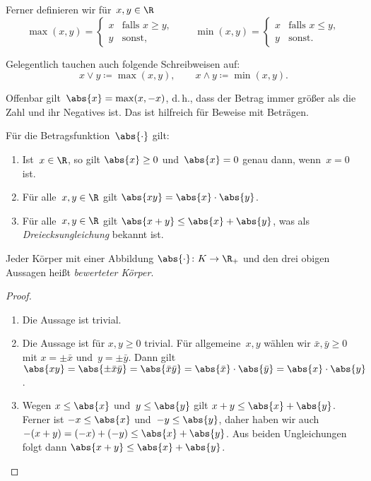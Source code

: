\documentclass[a4paper]{article}
\begin{document}
\begin{definition}
    Ferner definieren wir für~$x, y \in \R$
    \begin{equation*}
        \max(x, y) = \begin{cases}
            x & \text{falls } x \geq y, \\
            y & \text{sonst},
        \end{cases}\qquad
        \min(x, y) = \begin{cases}
            x & \text{falls } x \leq y, \\
            y & \text{sonst}.
        \end{cases}
    \end{equation*}
\end{definition}

Gelegentlich tauchen auch folgende Schreibweisen auf:
\begin{equation*}
    x \vee y \coloneqq \max(x, y), \qquad x \wedge y \coloneqq \min(x, y).
\end{equation*}

Offenbar gilt~$\abs{x} = \max(x, -x)$, d.\,h., dass der Betrag immer größer als die Zahl und ihr Negatives ist. Das ist hilfreich für Beweise mit Beträgen.

\begin{theorem}
    Für die Betragsfunktion~$\abs{\cdot}$ gilt:
    \begin{enumerate}
        \item Ist~$x \in \R$, so gilt $\abs{x} \geq 0$ und~$\abs{x} = 0$ genau dann, wenn~$x = 0$ ist.
        \item Für alle~$x, y \in \R$ gilt $\abs{x y} = \abs{x} \cdot \abs{y}$.
        \item Für alle~$x, y \in \R$ gilt $\abs{x + y} \leq \abs{x} + \abs{y}$, was als \emph{Dreiecksungleichung} bekannt ist.
    \end{enumerate}
\end{theorem}

Jeder Körper mit einer Abbildung $\abs{\cdot}\colon K \to \R_+$ und den drei obigen Aussagen heißt \emph{bewerteter Körper}.

\begin{proof}\leavevmode
    \begin{enumerate}
        \item Die Aussage ist trivial.
        \item Die Aussage ist für $x, y \geq 0$ trivial. Für allgemeine~$x, y$ wählen wir $\bar{x}, \bar{y} \geq 0$ mit $x = \pm\bar{x}$ und~$y = \pm\bar{y}$. Dann gilt $\abs{x y} = \abs{\pm \bar{x} \bar{y}} = \abs{\bar{x} \bar{y}} = \abs{\bar{x}} \cdot \abs{\bar{y}} = \abs{x} \cdot \abs{y}$.
        \item Wegen $x \leq \abs{x}$ und~$y \leq \abs{y}$ gilt $x + y \leq \abs{x} + \abs{y}$. Ferner ist $-x \leq \abs{x}$ und~$-y \leq \abs{y}$, daher haben wir auch $-(x + y) = (-x) + (-y) \leq \abs{x} + \abs{y}$. Aus beiden Ungleichungen folgt dann $\abs{x + y} \leq \abs{x} + \abs{y}$.\qedhere
    \end{enumerate}
\end{proof}
\end{document}
